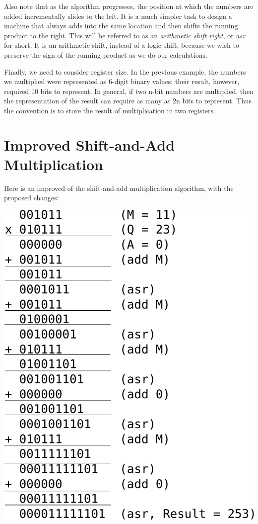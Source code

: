 \documentclass{article}
\begin{document}
Also note that as the algorithm progresses, the position at which the numbers are added incrementally slides to the left.
It is a much simpler task to design a machine that always adds into the same location and then shifts the running product to the right.
This will be referred to as an \emph{arithmetic shift right}, or \emph{asr} for short.
It is an arithmetic shift, instead of a logic shift, because we wish to preserve the sign of the running product as we do our calculations.

Finally, we need to consider register size.
In the previous example, the numbers we multiplied were represented as 6-digit binary values; their result, however, required 10 bits to represent.
In general, if two n-bit numbers are multiplied, then the representation of the result can require as many as 2n bits to represent.
Thus the convention is to store the result of multiplication in two registers.

\section{Improved Shift-and-Add Multiplication}
Here is an improved of the shift-and-add multiplication algorithm, with the proposed changes: %

\includegraphics[scale=0.5]{isaam3.pdf}
\end{document}
